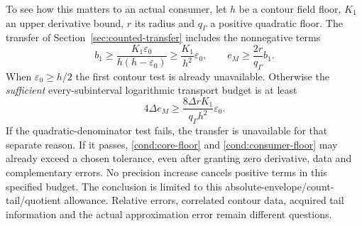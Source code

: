 To see how this matters to an actual consumer, let $h$ be a contour
field floor, $K_1$ an upper derivative bound, $r$ its radius and
$q_\Gamma$ a positive quadratic floor. The transfer of
Section~\ref{sec:counted-transfer} includes the nonnegative terms
\[
 b_1\ge\frac{K_1\varepsilon_0}{h(h-\varepsilon_0)}
       \ge\frac{K_1}{h^2}\varepsilon_0,\qquad
 e_M\ge\frac{2r}{q_\Gamma}b_1.
\]
When $\varepsilon_0\ge h/2$ the first contour test is already
unavailable. Otherwise the \emph{sufficient} every-subinterval
logarithmic transport budget is at least
\begin{equation}
 4\Delta e_M\ge
       \frac{8\Delta rK_1}{q_\Gamma h^2}\varepsilon_0 .
 \label{cond:consumer-floor}
\end{equation}
If the quadratic-denominator test fails, the transfer is unavailable
for that separate reason. If it passes, \eqref{cond:core-floor} and
\eqref{cond:consumer-floor} may already exceed a chosen tolerance,
even after granting zero derivative, data and complementary errors.
No precision increase cancels positive terms in this specified budget.
The conclusion is limited to this absolute-envelope/count-tail/quotient
allowance. Relative errors, correlated contour data, acquired tail
information and the actual approximation error remain different questions.
